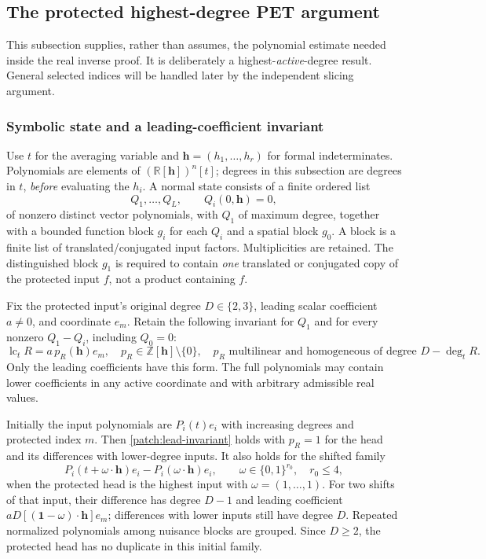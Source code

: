 \documentclass[11pt]{article}
\theoremstyle{definition}
\begin{document}
\subsection{The protected highest-degree PET argument}\label{patch:pet-producer}
This subsection supplies, rather than assumes, the polynomial estimate needed inside the
real inverse proof.  It is deliberately a highest-\emph{active}-degree result.  General selected
indices will be handled later by the independent slicing argument.

\subsubsection{Symbolic state and a leading-coefficient invariant}
Use $t$ for the averaging variable and $\mathbf h=(h_1,\ldots,h_r)$ for formal indeterminates.
Polynomials are elements of $(\mathbb R[\mathbf h])^n[t]$; degrees in this subsection are degrees
in $t$, \emph{before} evaluating the $h_i$.  A normal state consists of a finite ordered list
\[
 Q_1,\ldots,Q_L,\qquad Q_i(0,\mathbf h)=0,
\]
of nonzero distinct vector polynomials, with $Q_1$ of maximum degree, together with a bounded
function block $g_i$ for each $Q_i$ and a spatial block $g_0$.
A block is a finite list of translated/conjugated input factors.  Multiplicities are retained.
The distinguished block $g_1$ is required to contain \emph{one} translated or conjugated copy
of the protected input $f$, not a product containing $f$.

Fix the protected input's original degree $D\in\{2,3\}$, leading scalar coefficient $a\ne0$,
and coordinate $e_m$.  Retain the following invariant for $Q_1$ and for every nonzero
$Q_1-Q_i$, including $Q_0=0$:
\[
 \label{patch:lead-invariant}
 \operatorname{lc}_t R=a\,p_R(\mathbf h)e_m,
 \quad p_R\in\mathbb Z[\mathbf h]\setminus\{0\},
 \quad p_R\text{ multilinear and homogeneous of degree }D-\deg_t R.
 \tag{\theequation}
\]
Only the leading coefficients have this form.  The full polynomials may contain lower
coefficients in any active coordinate and with arbitrary admissible real values.

Initially the input polynomials are $P_i(t)e_i$ with increasing degrees and protected index $m$.
Then \eqref{patch:lead-invariant} holds with $p_R=1$ for the head and its differences with
lower-degree inputs.  It also holds for the shifted family
\[
 \label{patch:initial-shift-family}
 P_i(t+\omega\cdot\mathbf h)e_i-P_i(\omega\cdot\mathbf h)e_i,
       \qquad \omega\in\{0,1\}^{r_0},\quad r_0\leq4,
 \tag{\theequation}
\]
when the protected head is the highest input with $\omega=(1,\ldots,1)$.
For two shifts of that input, their difference has degree $D-1$ and leading coefficient
$aD[(\mathbf1-\omega)\cdot\mathbf h]e_m$; differences with lower inputs still have degree $D$.
Repeated normalized polynomials among nuisance blocks are grouped.  Since $D\geq2$, the
protected head has no duplicate in this initial family.
\end{document}
